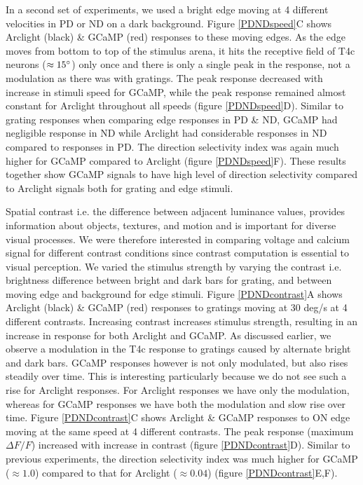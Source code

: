 \documentclass[9pt,lineno]{elife}
\begin{document}
In a second set of experiments, we used a bright edge moving at 4 different velocities in PD or ND on a dark background. Figure \ref{PDNDspeed}C shows Arclight (black) \& GCaMP (red) responses to these moving edges. As the edge moves from bottom to top of the stimulus arena, it hits the receptive field of T4c neurons ($\approx15\degree$) only once and there is only a single peak in the response, not a modulation as there was with gratings. The peak response decreased with increase in stimuli speed for GCaMP, while the peak response remained almost constant for Arclight throughout all speeds (figure \ref{PDNDspeed}D). Similar to grating responses when comparing edge responses in PD \& ND, GCaMP had negligible response in ND while Arclight had considerable responses in ND compared to responses in PD. The direction selectivity index was again much higher for GCaMP compared to Arclight (figure \ref{PDNDspeed}F). These results together show GCaMP signals to have high level of direction selectivity compared to Arclight signals both for grating and edge stimuli.

Spatial contrast i.e. the difference between adjacent luminance values, provides information about objects, textures, and motion and is important for diverse visual processes. We were therefore interested in comparing voltage and calcium signal for different contrast conditions since contrast computation is essential to visual perception. We varied the stimulus strength by varying the contrast i.e. brightness difference between bright and dark bars for grating, and between moving edge and background for edge stimuli. Figure \ref{PDNDcontrast}A shows Arclight (black) \& GCaMP (red) responses to gratings moving at 30 deg/s at 4 different contrasts. Increasing contrast increases stimulus strength, resulting in an increase in response for both Arclight and GCaMP. As discussed earlier, we observe a modulation in the T4c response to gratings caused by alternate bright and dark bars. GCaMP responses however is not only modulated, but also rises steadily over time. This is interesting particularly because we do not see such a rise for Arclight responses. For Arclight responses we have only the modulation, whereas for GCaMP responses we have both the modulation and slow rise over time. Figure \ref{PDNDcontrast}C shows Arclight \& GCaMP responses to ON edge moving at the same speed at 4 different contrasts. The peak response (maximum $\Delta F/F$) increased with increase in contrast (figure \ref{PDNDcontrast}D). Similar to previous experiments, the direction selectivity index was much higher for GCaMP ($\approx1.0$) compared to that for Arclight ($\approx0.04$) (figure \ref{PDNDcontrast}E,F). 
\end{document}

